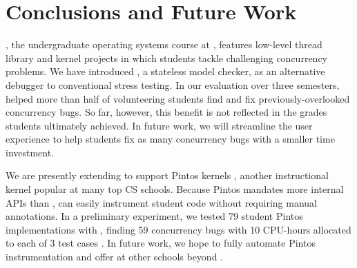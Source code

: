 \documentclass{sig-alternate-05-2015}
\begin{document}


\printccsdesc







\section{Conclusions and Future Work}
\label{sec:warpzone}

\fourten, the undergraduate operating systems course at \cmu,
features low-level thread library and kernel projects
in which students tackle challenging concurrency problems.
We have introduced \landslide, a stateless model checker,
as an alternative debugger to conventional stress testing.
In our evaluation over three semesters,
\landslide helped more than half of volunteering students find and fix previously-overlooked concurrency bugs.
So far, however, this benefit is not reflected in the grades students ultimately achieved.
In future work, we will streamline the user experience to help students fix as many concurrency bugs with a smaller time investment.

We are presently extending \landslide to support Pintos kernels \cite{pintos},
another instructional kernel popular at many top CS schools.
Because Pintos mandates more internal APIs than \pebbles,
\landslide can easily instrument student code without requiring manual annotations.
In a preliminary experiment, we tested 79 student Pintos implementations with \landslide,
finding 59 concurrency bugs with 10 CPU-hours allocated to each of 3 test cases \cite{quicksand-anonymized}.
In future work, we hope to fully automate Pintos instrumentation and offer \landslide at other schools beyond \cmu.
\end{document}

